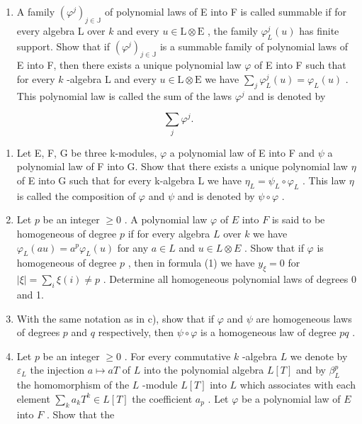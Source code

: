 \begin{enumerate}
\def\labelenumi{\alph{enumi})}
\setcounter{enumi}{1}
\tightlist
\item
  A family \((\varphi^j)_{j \in \mathbb{J}}\) of polynomial laws of E into F is called summable if for every algebra L over \(k\) and every \(u \in \mathrm{L} \otimes \mathrm{E}\) , the family \(\varphi_L^j(u)\) has finite support. Show that if \((\varphi^j)_{j \in \mathbb{J}}\) is a summable family of polynomial laws of E into F, then there exists a unique polynomial law \(\varphi\) of E into F such that for every \(k\) -algebra L and every \(u \in \mathrm{L} \otimes \mathrm{E}\) we have \(\sum_j \varphi_L^j(u) = \varphi_L(u)\) . This polynomial law is called the sum of the laws \(\varphi^j\) and is denoted by
\end{enumerate}

\[
\sum_ {j} \varphi^ {j}.
\]

\begin{enumerate}
\def\labelenumi{\alph{enumi})}
\setcounter{enumi}{2}
\item
  Let E, F, G be three k-modules, \(\varphi\) a polynomial law of E into F and \(\psi\) a polynomial law of F into G. Show that there exists a unique polynomial law \(\eta\) of E into G such that for every k-algebra L we have \(\eta_{L} = \psi_{L} \circ \varphi_{L}\) . This law \(\eta\) is called the composition of \(\varphi\) and \(\psi\) and is denoted by \(\psi \circ \varphi\) .
\item
  Let \(p\) be an integer \(\geqslant 0\) . A polynomial law \(\varphi\) of \(E\) into \(F\) is said to be homogeneous of degree \(p\) if for every algebra \(L\) over \(k\) we have \(\varphi_{L}(au) = a^{p}\varphi_{L}(u)\) for any \(a \in L\) and \(u \in L \otimes E\) . Show that if \(\varphi\) is homogeneous of degree \(p\) , then in formula (1) we have \(y_{\xi} = 0\) for \(|\xi| = \sum_{i} \xi(i) \neq p\) . Determine all homogeneous polynomial laws of degrees 0 and 1.
\item
  With the same notation as in c), show that if \(\varphi\) and \(\psi\) are homogeneous laws of degrees \(p\) and \(q\) respectively, then \(\psi \circ \varphi\) is a homogeneous law of degree \(pq\) .
\item
  Let \(p\) be an integer \(\geqslant 0\) . For every commutative \(k\) -algebra \(L\) we denote by \(\varepsilon_L\) the injection \(a \mapsto aT\) of \(L\) into the polynomial algebra \(L[T]\) and by \(\beta_L^p\) the homomorphism of the \(L\) -module \(L[T]\) into \(L\) which associates with each element \(\sum_k a_k T^k \in L[T]\) the coefficient \(a_p\) . Let \(\varphi\) be a polynomial law of \(E\) into \(F\) . Show that the
\end{enumerate}

